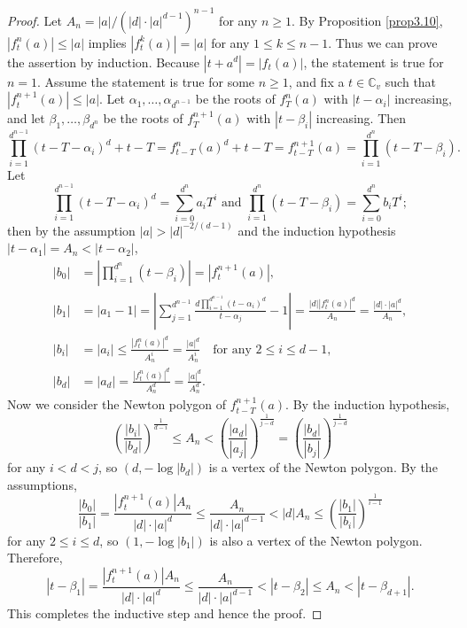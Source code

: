 \documentclass[11pt]{amsart}
\numberwithin{equation}{section}
\theoremstyle{plain}
\theoremstyle{definition}
\theoremstyle{remark}
\newcommand{\C}{\mathbb C}
\begin{document}
\begin{proof}
Let $A_{n}=|a|/(|d|\cdot|a|^{d-1})^{n-1}$ for any $n\geq1$. By Proposition
\ref{prop3.10}, $|f_{t}^{n}(a)|\leq|a|$ implies $|f_{t}^{k}(a)|=|a|$
for any $1\leq k\leq n-1$. Thus we can prove the assertion by induction.
Because $|t+a^{d}|=|f_{t}(a)|$, the statement is true for $n=1$.
Assume the statement is true for some $n\geq1$, and fix a $t\in\C_{v}$
such that $|f_{t}^{n+1}(a)|\leq|a|$. Let $\alpha_{1},\dots,\alpha_{d^{n-1}}$
be the roots of $f_{T}^{n}(a)$ with $|t-\alpha_{i}|$ increasing,
and let $\beta_{1},\dots,\beta_{d^{n}}$ be the roots of $f_{T}^{n+1}(a)$
with $|t-\beta_{i}|$ increasing. Then
\[
\prod_{i=1}^{d^{n-1}}(t-T-\alpha_{i})^{d}+t-T=f_{t-T}^{n}(a)^{d}+t-T=f_{t-T}^{n+1}(a)=\prod_{i=1}^{d^{n}}(t-T-\beta_{i}).
\]
Let
\[
\prod_{i=1}^{d^{n-1}}(t-T-\alpha_{i})^{d}=\sum_{i=0}^{d^{n}}a_{i}T^{i}\text{ and }\prod_{i=1}^{d^{n}}(t-T-\beta_{i})=\sum_{i=0}^{d^{n}}b_{i}T^{i};
\]
then by the assumption $|a|>|d|^{-2/(d-1)}$ and the induction hypothesis
$|t-\alpha_{1}|=A_{n}<|t-\alpha_{2}|$,
\begin{align*}
|b_{0}| & =\left|\prod_{i=1}^{d^{n}}(t-\beta_{i})\right|=\left|f_{t}^{n+1}(a)\right|,\\
|b_{1}| & =|a_{1}-1|=\left|\sum_{j=1}^{d^{n-1}}\frac{d\prod_{i=1}^{d^{n-1}}(t-\alpha_{i})^{d}}{t-\alpha_{j}}-1\right|=\frac{|d|\left|f_{t}^{n}(a)\right|^{d}}{A_{n}}=\frac{|d|\cdot|a|^{d}}{A_{n}},\\
|b_{i}| & =|a_{i}|\leq\frac{\left|f_{t}^{n}(a)\right|^{d}}{A_{n}^{i}}=\frac{|a|^{d}}{A_{n}^{i}}\quad\text{for any }2\leq i\leq d-1,\\
|b_{d}| & =|a_{d}|=\frac{\left|f_{t}^{n}(a)\right|^{d}}{A_{n}^{d}}=\frac{|a|^{d}}{A_{n}^{d}}.
\end{align*}
Now we consider the Newton polygon of $f_{t-T}^{n+1}(a)$. By the
induction hypothesis,
\[
\left(\frac{|b_{i}|}{|b_{d}|}\right)^{\frac{1}{d-i}}\leq A_{n}<\left(\frac{|a_{d}|}{|a_{j}|}\right)^{\frac{1}{j-d}}=\left(\frac{|b_{d}|}{|b_{j}|}\right)^{\frac{1}{j-d}}
\]
for any $i<d<j$, so $(d,-\log|b_{d}|)$ is a vertex of the Newton
polygon. By the assumptions,
\[
\frac{|b_{0}|}{|b_{1}|}=\frac{\left|f_{t}^{n+1}(a)\right|A_{n}}{|d|\cdot|a|^{d}}\leq\frac{A_{n}}{|d|\cdot|a|^{d-1}}<|d|A_{n}\leq\left(\frac{|b_{1}|}{|b_{i}|}\right)^{\frac{1}{i-1}}
\]
for any $2\leq i\leq d$, so $(1,-\log|b_{1}|)$ is also a vertex
of the Newton polygon. Therefore,
\[
|t-\beta_{1}|=\frac{\left|f_{t}^{n+1}(a)\right|A_{n}}{|d|\cdot|a|^{d}}\leq\frac{A_{n}}{|d|\cdot|a|^{d-1}}<|t-\beta_{2}|\leq A_{n}<|t-\beta_{d+1}|.
\]
This completes the inductive step and hence the proof.
\end{proof}
\end{document}
